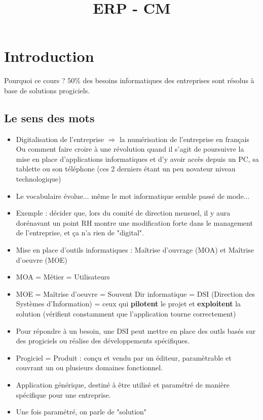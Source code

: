 \documentclass[11pt,a4paper]{article}
\title{ERP - CM}
\begin{document}
	
	\maketitle
	
	\section{Introduction}
	
	Pourquoi ce cours ? 50\% des besoins informatiques des entreprises sont résolus à base de solutions progiciels.
	
	\subsection{Le sens des mots}
	
	\begin{itemize}
		\item Digitalisation de l'entreprise $\Rightarrow$ la numérisation de l'entreprise en français\\
		Ou comment faire croire à une révolution quand il s'agit de poursuivre la mise en place d'applications informatiques et d'y avoir accès depuis un PC, sa tablette ou son téléphone (ces 2 derniers étant un peu novateur niveau technologique)
		\item Le vocabulaire évolue... même le mot informatique semble passé de mode...
		\item Exemple : décider que, lors du comité de direction mensuel, il y aura dorénavant un point RH montre une modification forte dans le management de l'entreprise, et ça n'a rien de "digital".
		\item Mise en place d'outils informatiques : Maîtrise d'ouvrage (MOA) et Maîtrise d'oeuvre (MOE)
		\item MOA = Métier = Utilisateurs
		\item MOE = Maîtrise d'oeuvre = Souvent Dir informatique = DSI (Direction des Systèmes d'Information) = ceux qui \textbf{pilotent} le projet et \textbf{exploitent} la solution (vérifient constamment que l'application tourne correctement)
		\item Pour répondre à un besoin, une DSI peut mettre en place des outls basés sur des progiciels ou réalise des développements spécifiques.
		\item Progiciel = Produit : conçu et vendu par un éditeur, paramètrable et couvrant un ou plusieurs domaines fonctionnel.
		\item Application générique, destiné à être utilisé et paramétré de manière spécifique pour une entreprise.
		\item Une fois paramétré, on parle de "solution"
	\end{itemize}
\end{document}
